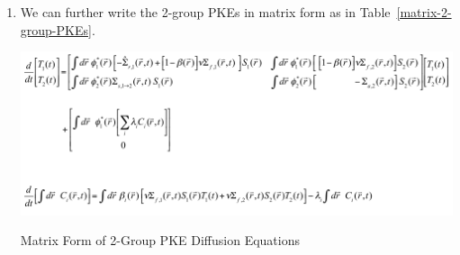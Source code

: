 \documentclass{school-22.211-notes}
\begin{document}
\begin{enumerate}
\item We can further write the 2-group PKEs in matrix form as in Table~\ref{matrix-2-group-PKEs}. 
  \begin{table}[ht]
    \centering
    \includegraphics[width=6.5in]{images/pke/matrix-2-group-PKEs.png}
    \caption{Matrix Form of 2-Group PKE Diffusion Equations} \label{matrix-2-group-PKEs}
  \end{table}
\end{enumerate}
\end{document}
